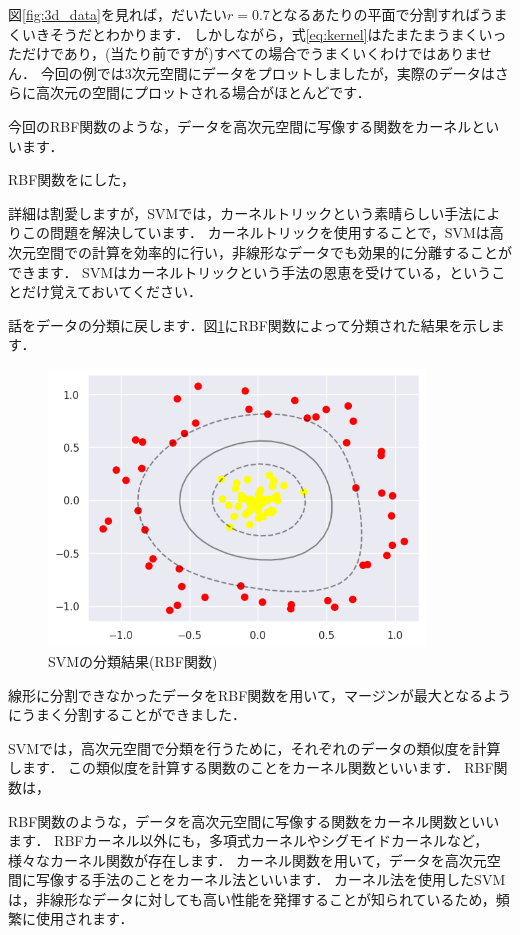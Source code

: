 \documentclass{jarticle}
\begin{document}
図\ref{fig:3d_data}を見れば，だいたい$r=0.7$となるあたりの平面で分割すればうまくいきそうだとわかります．
しかしながら，式\ref{eq:kernel}はたまたまうまくいっただけであり，(当たり前ですが)すべての場合でうまくいくわけではありません．
今回の例では3次元空間にデータをプロットしましたが，実際のデータはさらに高次元の空間にプロットされる場合がほとんどです．

今回のRBF関数のような，データを高次元空間に写像する関数をカーネルといいます．



RBF関数をにした，



詳細は割愛しますが，SVMでは，カーネルトリックという素晴らしい手法によりこの問題を解決しています．
カーネルトリックを使用することで，SVMは高次元空間での計算を効率的に行い，非線形なデータでも効果的に分離することができます．
SVMはカーネルトリックという手法の恩恵を受けている，ということだけ覚えておいてください．

話をデータの分類に戻します．図\ref{fig:svm_RBF}にRBF関数によって分類された結果を示します．

\begin{figure}[H]
  \centering
  \includegraphics[width=10cm]{fig/svm_rbf_db.png}
  \caption{SVMの分類結果(RBF関数)}
  \label{fig:svm_RBF}
\end{figure}

線形に分割できなかったデータをRBF関数を用いて，マージンが最大となるようにうまく分割することができました．

SVMでは，高次元空間で分類を行うために，それぞれのデータの類似度を計算します．
この類似度を計算する関数のことをカーネル関数といいます．
RBF関数は，

RBF関数のような，データを高次元空間に写像する関数をカーネル関数といいます．
RBFカーネル以外にも，多項式カーネルやシグモイドカーネルなど，様々なカーネル関数が存在します．
カーネル関数を用いて，データを高次元空間に写像する手法のことをカーネル法といいます．
カーネル法を使用したSVMは，非線形なデータに対しても高い性能を発揮することが知られているため，頻繁に使用されます．
\end{document}
